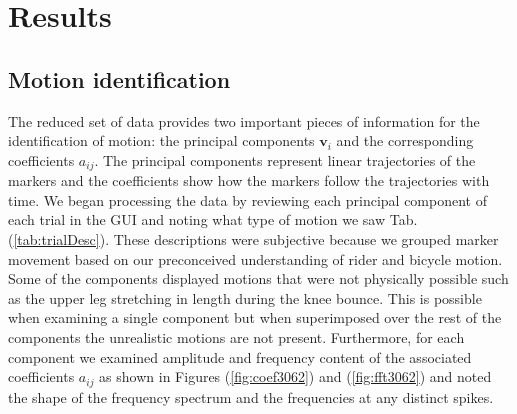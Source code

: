 \documentclass[smallextended]{svjour3}     %
\begin{document}
\section{Results}
\label{sec:results}
\subsection{Motion identification}
\label{sec:motionId}
The reduced set of data provides two important pieces of information for the
identification of motion: the principal components $\mathbf{v}_i$ and the
corresponding coefficients $a_{ij}$. The principal components represent linear
trajectories of the markers and the coefficients show how the markers follow
the trajectories with time. We began processing the data by reviewing each
principal component of each trial in the GUI and noting what type of
motion we saw Tab. (\ref{tab:trialDesc}). These descriptions were subjective
because we grouped marker movement based on our preconceived understanding of
rider and bicycle motion. Some of the components displayed motions that were not
physically possible such as the upper leg stretching in length during the knee
bounce. This is possible when examining a single component but when
superimposed over the rest of the components the unrealistic motions are not
present. Furthermore, for each component we examined amplitude and frequency
content of the associated coefficients $a_{ij}$ as shown in Figures
(\ref{fig:coef3062}) and (\ref{fig:fft3062}) and noted the shape of the
frequency spectrum and the
frequencies at any distinct spikes.
\end{document}
